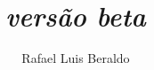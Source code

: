 \documentclass[oneside,openany,a4paper]{book}
\author{Rafael Luis Beraldo}
\title{
	{\Huge \caps{O (Pequeno) Manual de \LaTeX{} do Linguista Contempor\^aneo}
				{\small \emph{versão beta}}
	} \\
}
\begin{document}
\maketitle
\tableofcontents
\newpage
%








\printglossaries

\end{document}
